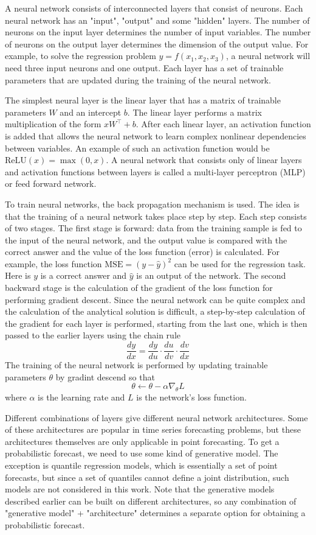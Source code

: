 \documentclass[12pt,a4paper]{article}
\begin{document}
A neural network consists of interconnected layers that consist of neurons. Each neural network has an "input", "output" and some "hidden" layers. The number of neurons on the input layer determines the number of input variables. The number of neurons on the output layer determines the dimension of the output value. For example, to solve the regression problem $y = f (x_1, x_2, x_3)$, a neural network will need three input neurons and one output. Each layer has a set of trainable parameters that are updated during the training of the neural network. 

The simplest neural layer is the linear layer that has a matrix of trainable parameters $W$ and an intercept $b$. The linear layer performs a matrix multiplication of the form $xW^\top + b$. After each linear layer, an activation function is added that allows the neural network to learn complex nonlinear dependencies between variables. An example of such an activation function would be $\text{ReLU} (x) = \max (0, x)$. A neural network that consists only of linear layers and activation functions between layers is called a multi-layer perceptron (MLP) or feed forward network. 

To train neural networks, the back propagation mechanism is used. The idea is that the training of a neural network takes place step by step. Each step consists of two stages. The first stage is forward: data from the training sample is fed to the input of the neural network, and the output value is compared with the correct answer and the value of the loss function (error) is calculated. For example, the loss function $\text{MSE} = (y - \hat y)^2$ can be used for the regression task. Here is $y$ is a correct answer and $\hat y$ is an output of the network. The second backward stage is the calculation of the gradient of the loss function for performing gradient descent. Since the neural network can be quite complex and the calculation of the analytical solution is difficult, a step-by-step calculation of the gradient for each layer is performed, starting from the last one, which is then passed to the earlier layers using the chain rule
$$\frac{d y}{d x}=\frac{d y}{d u} \cdot \frac{d u}{d v} \cdot \frac{d v}{d x}$$
The training of the neural network is performed by updating trainable parameters $\theta$ by gradint descend so that
$$\theta \leftarrow \theta - \alpha \nabla_\theta L$$
where $\alpha$ is the learning rate and $L$ is the network's loss function.

Different combinations of layers give different neural network architectures. Some of these architectures are popular in time series forecasting problems, but these architectures themselves are only applicable in point forecasting. To get a probabilistic forecast, we need to use some kind of generative model. The exception is quantile regression models, which is essentially a set of point forecasts, but since a set of quantiles cannot define a joint distribution, such models are not considered in this work. Note that the generative models described earlier can be built on different architectures, so any combination of "generative model" + "architecture" determines a separate option for obtaining a probabilistic forecast.
\end{document}
